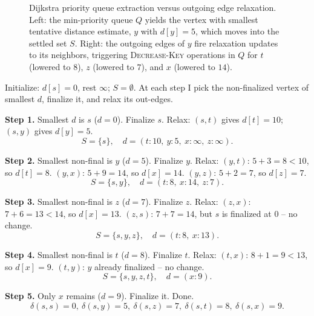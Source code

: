 \begin{figure}[h]
\caption{Dijkstra priority queue extraction versus outgoing edge relaxation. Left: the min-priority queue $Q$ yields the vertex with smallest tentative distance estimate, $y$ with $d[y]=5$, which moves into the settled set $S$. Right: the outgoing edges of $y$ fire relaxation updates to its neighbors, triggering \textsc{Decrease-Key} operations in $Q$ for $t$ (lowered to $8$), $z$ (lowered to $7$), and $x$ (lowered to $14$).}
\label{ch24:dij-graph}
\end{figure}

\begin{labbox}
Initialize: $d[s]=0$, rest $\infty$; $S=\emptyset$. At each step I pick the
non-finalized vertex of smallest $d$, finalize it, and relax its out-edges.

\medskip
\textbf{Step 1.} Smallest $d$ is $s$ ($d=0$). Finalize $s$. Relax: $(s,t)$ gives
$d[t]=10$; $(s,y)$ gives $d[y]=5$.
\[
S=\{s\},\quad d=(t{:}10,\ y{:}5,\ x{:}\infty,\ z{:}\infty).
\]

\medskip
\textbf{Step 2.} Smallest non-final is $y$ ($d=5$). Finalize $y$. Relax:
$(y,t)$: $5+3=8 < 10$, so $d[t]=8$. $(y,x)$: $5+9=14$, so $d[x]=14$. $(y,z)$:
$5+2=7$, so $d[z]=7$.
\[
S=\{s,y\},\quad d=(t{:}8,\ x{:}14,\ z{:}7).
\]

\medskip
\textbf{Step 3.} Smallest non-final is $z$ ($d=7$). Finalize $z$. Relax:
$(z,x)$: $7+6=13 < 14$, so $d[x]=13$. $(z,s)$: $7+7=14$, but $s$ is finalized at
$0$ -- no change.
\[
S=\{s,y,z\},\quad d=(t{:}8,\ x{:}13).
\]

\medskip
\textbf{Step 4.} Smallest non-final is $t$ ($d=8$). Finalize $t$. Relax:
$(t,x)$: $8+1=9 < 13$, so $d[x]=9$. $(t,y)$: $y$ already finalized -- no change.
\[
S=\{s,y,z,t\},\quad d=(x{:}9).
\]

\medskip
\textbf{Step 5.} Only $x$ remains ($d=9$). Finalize it. Done.
\[
\delta(s,s)=0,\ \delta(s,y)=5,\ \delta(s,z)=7,\ \delta(s,t)=8,\ \delta(s,x)=9.
\]
\end{labbox}

